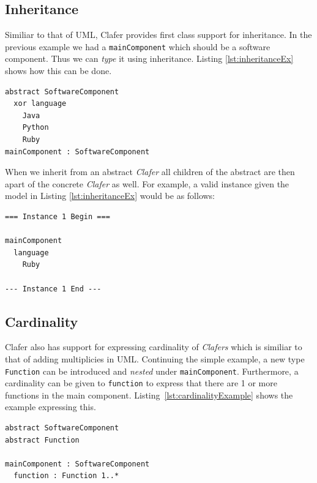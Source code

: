 \documentclass[10pt,oneside]{IEEEtran}
\begin{document}
\subsection{Inheritance}
Similiar to that of UML, Clafer provides first class support for inheritance. In the previous
example we had a \lstinline$mainComponent$ which should be a software component. Thus we can
\textit{type} it using inheritance. Listing \ref{lst:inheritanceEx} shows how this can be done.

\begin{lstlisting}[label={lst:inheritanceEx},caption={Inheritance example}]
abstract SoftwareComponent
  xor language
    Java
    Python
    Ruby
mainComponent : SoftwareComponent
\end{lstlisting}

When we inherit from an abstract \textit{Clafer} all children of the abstract are then apart of the concrete \textit{Clafer} as well. For example, a valid instance given the model in Listing \ref{lst:inheritanceEx} would be as follows:
\begin{verbatim}
=== Instance 1 Begin ===

mainComponent
  language
    Ruby

--- Instance 1 End ---
\end{verbatim}

\subsection{Cardinality}
Clafer also has support for expressing cardinality of \textit{Clafers} which is similiar to
that of adding multiplicies in UML. Continuing the simple example, a new type \lstinline$Function$ can be introduced
and \textit{nested} under \lstinline$mainComponent$. Furthermore, a cardinality can be given to
\lstinline$function$ to express that there are 1 or more functions in the main component.
Listing~\ref{lst:cardinalityExample} shows the example expressing this.

\begin{lstlisting}[label={lst:cardinalityExample},caption={Example of nesting and cardinality}]
abstract SoftwareComponent
abstract Function

mainComponent : SoftwareComponent
  function : Function 1..*
\end{lstlisting}
\end{document}
